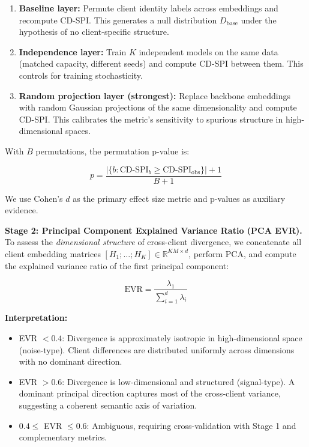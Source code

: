 \documentclass{article}
\begin{document}
\begin{enumerate}[label=(\alph*)]
    \item \textbf{Baseline layer:} Permute client identity labels across embeddings and recompute CD-SPI. This generates a null distribution $D_{\text{base}}$ under the hypothesis of no client-specific structure.
    \item \textbf{Independence layer:} Train $K$ independent models on the same data (matched capacity, different seeds) and compute CD-SPI between them. This controls for training stochasticity.
    \item \textbf{Random projection layer (strongest):} Replace backbone embeddings with random Gaussian projections of the same dimensionality and compute CD-SPI. This calibrates the metric's sensitivity to spurious structure in high-dimensional spaces.
\end{enumerate}

With $B$ permutations, the permutation p-value is:

\begin{equation}
p = \frac{|\{b: \text{CD-SPI}_b \geq \text{CD-SPI}_{\text{obs}}\}| + 1}{B + 1}
\end{equation}

We use Cohen's $d$ as the primary effect size metric and p-values as auxiliary evidence.

\textbf{Stage 2: Principal Component Explained Variance Ratio (PCA EVR).}
To assess the \emph{dimensional structure} of cross-client divergence, we concatenate all client embedding matrices $[H_1; \ldots; H_K] \in \mathbb{R}^{KM \times d}$, perform PCA, and compute the explained variance ratio of the first principal component:

\begin{equation}
\text{EVR} = \frac{\lambda_1}{\sum_{i=1}^{d} \lambda_i}
\end{equation}

\textbf{Interpretation:}
\begin{itemize}[nosep]
    \item EVR $< 0.4$: Divergence is approximately isotropic in high-dimensional space (noise-type). Client differences are distributed uniformly across dimensions with no dominant direction.
    \item EVR $> 0.6$: Divergence is low-dimensional and structured (signal-type). A dominant principal direction captures most of the cross-client variance, suggesting a coherent semantic axis of variation.
    \item $0.4 \leq$ EVR $\leq 0.6$: Ambiguous, requiring cross-validation with Stage 1 and complementary metrics.
\end{itemize}
\end{document}
